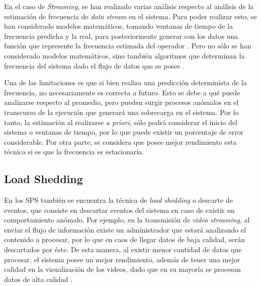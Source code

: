 En el caso de \textit{Streaming}, se han realizado varias análisis respecto al análisis de la estimación de frecuencia de \textit{data stream} en el sistema. Para poder realizar esto, se han considerado modelos matemáticos, tomando ventanas de tiempo de la frecuencia predicha y la real, para posteriormente generar con los datos una función que represente la frecuencia estimada del operador \citep{Ganguly09}. Pero no sólo se han considerado modelos matemáticos, sino también algoritmos que determinan la frecuencia del sistema dado el flujo de datos que se posee \citep{BhuvanagiriGKS06}.

Una de las limitaciones es que si bien realiza una predicción determinista de la frecuencia, no necesariamente es correcta a futuro. Esto se debe a qué puede analizarse respecto al promedio, pero pueden surgir procesos anómalos en el transcurso de la ejecución que generará una sobrecarga en el sistema. Por lo tanto, la estimación al realizarse \textit{a priori}, sólo podrá considerar el inicio del sistema o ventanas de tiempo, por lo que puede existir un porcentaje de error considerable. Por otra parte, se considera que posee mejor rendimiento esta técnica si es que la frecuencia es estacionaria.

\subsection{Load Shedding}

En los SPS también se encuentra la técnica de \textit{load shedding} o descarte de eventos, que consiste en descartar eventos del sistema en caso de existir un comportamiento anómalo. Por ejemplo, en la transmisión de \textit{video streaming}, al enviar el flujo de información existe un administrador que estará analizando el contenido a procesar, por lo que en caos de llegar datos de baja calidad, serán descartados por éste. De esta manera, al existir menor cantidad de datos que procesar, el sistema posee un mejor rendimiento, además de tener una mejor calidad en la visualización de los videos, dado que en su mayoría se procesan datos de alta calidad \citep{SheuC09}. 

